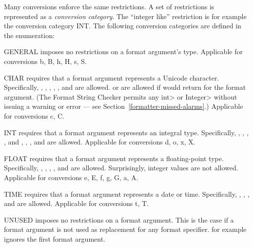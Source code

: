 \noindent Many conversions enforce the same restrictions.  A set of
restrictions is represented as a \emph{conversion
category}. The ``integer like'' restriction is for example the conversion
category INT\@.  The following conversion categories are defined in the
 enumeration:

\begin{description}
\item{GENERAL} imposes no restrictions on a format argument's type. Applicable for
    conversions b, B, h, H, s, S.

\item{CHAR} requires that a format argument represents a Unicode character.
    Specifically, , , ,
    , , and  are allowed.
     or  are allowed if
     would return 
    for the format argument. (The Format String Checker permits any \<int>
    or \<Integer> without issuing a warning or error --- see
    Section~\ref{formatter-missed-alarms}.)
    Applicable for conversions c, C.

\item{INT} requires that a format argument represents an integral type. Specifically,
    , , , ,
     and , ,
    , and  are allowed. Applicable for
    conversions d, o, x, X.  

\item{FLOAT} requires that a format argument represents a floating-point type.  Specifically,
    , , ,
    , and  are allowed. Surprisingly, integer
    values are not allowed. Applicable for
    conversions e, E, f, g, G, a, A.
 
\item{TIME} requires that a format argument represents a date or time.
    Specifically, , , , and
     are allowed.  Applicable for conversions t, T.

\item{UNUSED} imposes no restrictions on a format argument. This is the case if a
    format argument is not used as replacement for any format specifier.
     for example ignores the first format argument. 
\end{description}

